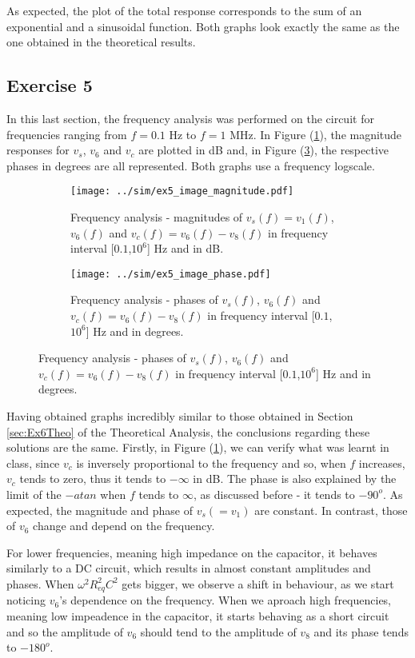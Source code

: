 As expected, the plot of the total response corresponds to the sum of an exponential and a sinusoidal function. Both graphs look exactly the same as the one obtained in the theoretical results.

\subsection{Exercise 5} \label{sec:Ex5Sim}

In this last section, the frequency analysis was performed on the circuit for frequencies ranging from $f=0.1$ Hz to $f=1$ MHz. In Figure (\ref{fig:Ex5_Image_Magnitude}), the magnitude responses for $v_s$, $v_6$ and $v_c$ are plotted in dB and, in Figure (\ref{fig:Ex5_Image_Phase}), the respective phases in degrees are all represented. Both graphs use a frequency logscale.

\vspace{-30mm}

\begin{figure}[H]
  \begin{subfigure}{.49\linewidth}
    \centering
    \texttt{[image: ../sim/ex5\_image\_magnitude.pdf]}
    \footnotesize
    \caption{Frequency analysis - magnitudes of $v_s(f)=v_1(f)$, $v_6(f)$ and $v_c(f)=v_6(f)-v_8(f)$ in frequency interval [$0.1$,$10^{6}$] Hz and in dB.}
    \label{fig:Ex5_Image_Magnitude}
  \end{subfigure}
  \hspace{5mm}
  \begin{subfigure}{.49\linewidth}
    \centering
    \texttt{[image: ../sim/ex5\_image\_phase.pdf]}  
    \caption{Frequency analysis - phases of $v_s(f)$, $v_6(f)$ and $v_c(f)=v_6(f)-v_8(f)$ in frequency interval [$0.1$,$10^{6}$] Hz and in degrees.}
    \label{fig:Ex5_Image_Phase}
  \end{subfigure}
\end{figure}

Having obtained graphs incredibly similar to those obtained in Section \ref{sec:Ex6Theo} of the Theoretical Analysis, the conclusions regarding these solutions are the same. Firstly, in Figure (\ref{fig:Ex5_Image_Magnitude}), we can verify what was learnt in class, since $v_c$ is inversely proportional to the frequency and so, when $f$ increases, $v_c$  tends to zero, thus it tends to $-\infty$ in dB. The phase is also explained by the limit of the $-atan$ when $f$ tends to $\infty$, as discussed before - it tends to $-90^{o}$.  As expected, the magnitude and phase of $v_s(=v_1)$ are constant. In contrast, those of $v_6$ change and depend on the frequency.
\par
For lower frequencies, meaning high impedance on the capacitor, it behaves similarly to a DC circuit, which results in almost constant amplitudes and phases. When $\omega^{2}R_{eq}^{2}C^{2}$ gets bigger, we observe a shift in behaviour, as we start noticing $v_6$'s dependence on the frequency. When we aproach high frequencies, meaning low impeadence in the capacitor, it starts behaving as a short circuit and so the amplitude of $v_6$ should tend to the amplitude of $v_8$ and its phase tends to $-180^{o}$.   
